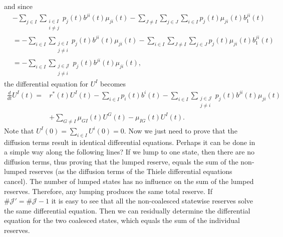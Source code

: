 \documentclass[12pt]{article}
\theoremstyle{my_thm}
\begin{document}
and since
\begin{align*}
&-\sum_{j \in I}  \sum_{ \substack{i \in I \\i \neq j}} p_j(t) b^{ji}(t) \mu_{ji}(t) 
-\sum_{J \neq I} \sum_{j \in J} \sum_{i \in I}p_j(t) \mu_{ji}(t)b_1^{ji}(t)
\\
&=
- \sum_{ i \in I} \sum_{\substack{j \in I \\j \neq i}}  p_j(t) b^{ji}(t) \mu_{ji}(t) 
- \sum_{i \in I} \sum_{J \neq I} \sum_{j \in J} p_j(t) \mu_{ji}(t)b_1^{ji}(t)
\\
&=
-\sum_{i \in I} \sum_{ \substack{j \in \mathcal{J} \\j \neq i}}p_j(t) b^{ji}(t) \mu_{ji}(t),
\end{align*}
the differential equation for $U^I$ becomes
\begin{align*}
\frac{d}{dt}U^I(t)=&r^*(t) U^I(t)-\sum_{i \in I} p_i(t)  b^i(t) 
-\sum_{i \in I} \sum_{ \substack{j \in \mathcal{J} \\j \neq i}}p_j(t) b^{ji}(t) \mu_{ji}(t)
\\
&+\sum_{G \neq I} \mu_{GI}(t) U^G(t)-\mu_{IG}(t)U^I(t).
\end{align*}
Note that $U^I(0)=\sum_{i \in I} U^i(0)=0$. Now we just need to prove that the diffusion terms result in identical differential equations. Perhaps it can be done in a simple way along the following lines? If we lump to one state, then there are no diffusion terms, thus proving that the lumped reserve, equals the sum of the non-lumped reserves (as the diffusion terms of the Thiele differential equations cancel). The number of lumped states has no influence on the sum of the lumped reserves. Therefore, any lumping produces the same total reserve. If $\#\mathcal{J}'=\#\mathcal{J}-1$ it is easy to see that all the non-coalesced statewise reserves solve the same differential equation. Then we can residually determine the differential equation for the two coalesced states, which equals the sum of the individual reserves.
\\[12pt]
\end{document}
